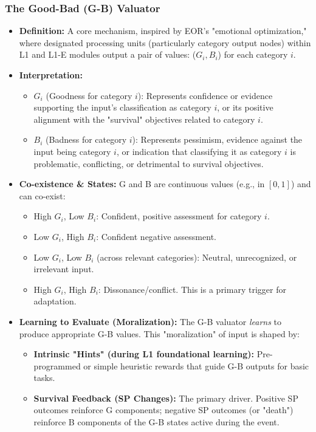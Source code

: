 \documentclass{article}
\begin{document}
\subsubsection{The Good-Bad (G-B) Valuator}
\begin{itemize}
    \item \textbf{Definition:} A core mechanism, inspired by EOR's "emotional optimization," where designated processing units (particularly category output nodes) within L1 and L1-E modules output a pair of values: ($G_i, B_i$) for each category $i$.
    \item \textbf{Interpretation:}
    \begin{itemize}
        \item $G_i$ (Goodness for category $i$): Represents confidence or evidence supporting the input's classification as category $i$, or its positive alignment with the "survival" objectives related to category $i$.
        \item $B_i$ (Badness for category $i$): Represents pessimism, evidence against the input being category $i$, or indication that classifying it as category $i$ is problematic, conflicting, or detrimental to survival objectives.
    \end{itemize}
    \item \textbf{Co-existence \& States:} G and B are continuous values (e.g., in $[0,1]$) and can co-exist:
    \begin{itemize}
        \item High $G_i$, Low $B_i$: Confident, positive assessment for category $i$.
        \item Low $G_i$, High $B_i$: Confident negative assessment.
        \item Low $G_i$, Low $B_i$ (across relevant categories): Neutral, unrecognized, or irrelevant input.
        \item High $G_i$, High $B_i$: Dissonance/conflict. This is a primary trigger for adaptation.
    \end{itemize}
    \item \textbf{Learning to Evaluate (Moralization):} The G-B valuator \textit{learns} to produce appropriate G-B values. This "moralization" of input is shaped by:
    \begin{itemize}
        \item \textbf{Intrinsic "Hints" (during L1 foundational learning):} Pre-programmed or simple heuristic rewards that guide G-B outputs for basic tasks.
        \item \textbf{Survival Feedback (SP Changes):} The primary driver. Positive SP outcomes reinforce G components; negative SP outcomes (or "death") reinforce B components of the G-B states active during the event.

\end{itemize}
\end{itemize}
\end{document}
